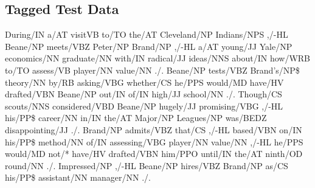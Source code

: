 \documentclass[11pt,a4paper,twocolumn]{article}
\begin{document}
	\subsection{Tagged Test Data}	
	During\textcolor{hlit}{/IN}
a\textcolor{hlit}{/AT}
visit\textcolor{hlit}{VB}
to\textcolor{hlit}{/TO}
the\textcolor{hlit}{/AT}
Cleveland\textcolor{hlit}{/NP}
Indians\textcolor{hlit}{/NPS}
,\textcolor{hlit}{/-HL}
Beane\textcolor{hlit}{/NP}
meets\textcolor{hlit}{/VBZ}
Peter\textcolor{hlit}{/NP}
Brand\textcolor{hlit}{/NP}
,\textcolor{hlit}{/-HL}
a\textcolor{hlit}{/AT}
young\textcolor{hlit}{/JJ}
Yale\textcolor{hlit}{/NP}
economics\textcolor{hlit}{/NN}
graduate\textcolor{hlit}{/NN}
with\textcolor{hlit}{/IN}
radical\textcolor{hlit}{/JJ}
ideas\textcolor{hlit}{/NNS}
about\textcolor{hlit}{/IN}
how\textcolor{hlit}{/WRB}
to\textcolor{hlit}{/TO}
assess\textcolor{hlit}{/VB}
player\textcolor{hlit}{/NN}
value\textcolor{hlit}{/NN}
.\textcolor{hlit}{/.}
Beane\textcolor{hlit}{/NP}
tests\textcolor{hlit}{/VBZ}
Brand's\textcolor{hlit}{/NP\$}
theory\textcolor{hlit}{/NN}
by\textcolor{hlit}{/RB}
asking\textcolor{hlit}{/VBG}
whether\textcolor{hlit}{/CS}
he\textcolor{hlit}{/PPS}
would\textcolor{hlit}{/MD}
have\textcolor{hlit}{/HV}
drafted\textcolor{hlit}{/VBN}
Beane\textcolor{hlit}{/NP}
out\textcolor{hlit}{/IN}
of\textcolor{hlit}{/IN}
high\textcolor{hlit}{/JJ}
school\textcolor{hlit}{/NN}
.\textcolor{hlit}{/.}
Though\textcolor{hlit}{/CS}
scouts\textcolor{hlit}{/NNS}
considered\textcolor{hlit}{/VBD}
Beane\textcolor{hlit}{/NP}
hugely\textcolor{hlit}{/JJ}
promising\textcolor{hlit}{/VBG}
,\textcolor{hlit}{/-HL}
his\textcolor{hlit}{/PP\$}
career\textcolor{hlit}{/NN}
in\textcolor{hlit}{/IN}
the\textcolor{hlit}{/AT}
Major\textcolor{hlit}{/NP}
Leagues\textcolor{hlit}{/NP}
was\textcolor{hlit}{/BEDZ}
disappointing\textcolor{hlit}{/JJ}
.\textcolor{hlit}{/.}
Brand\textcolor{hlit}{/NP}
admits\textcolor{hlit}{/VBZ}
that\textcolor{hlit}{/CS}
,\textcolor{hlit}{/-HL}
based\textcolor{hlit}{/VBN}
on\textcolor{hlit}{/IN}
his\textcolor{hlit}{/PP\$}
method\textcolor{hlit}{/NN}
of\textcolor{hlit}{/IN}
assessing\textcolor{hlit}{/VBG}
player\textcolor{hlit}{/NN}
value\textcolor{hlit}{/NN}
,\textcolor{hlit}{/-HL}
he\textcolor{hlit}{/PPS}
would\textcolor{hlit}{/MD}
not\textcolor{hlit}{/*}
have\textcolor{hlit}{/HV}
drafted\textcolor{hlit}{/VBN}
him\textcolor{hlit}{/PPO}
until\textcolor{hlit}{/IN}
the\textcolor{hlit}{/AT}
ninth\textcolor{hlit}{/OD}
round\textcolor{hlit}{/NN}
.\textcolor{hlit}{/.}
Impressed\textcolor{hlit}{/NP}
,\textcolor{hlit}{/-HL}
Beane\textcolor{hlit}{/NP}
hires\textcolor{hlit}{/VBZ}
Brand\textcolor{hlit}{/NP}
as\textcolor{hlit}{/CS}
his\textcolor{hlit}{/PP\$}
assistant\textcolor{hlit}{/NN}
manager\textcolor{hlit}{/NN}
.\textcolor{hlit}{/.}
\end{document}
